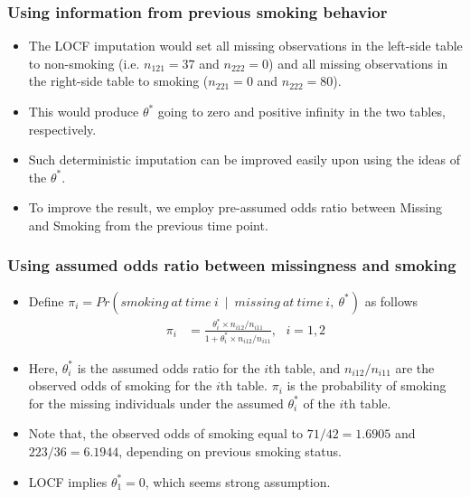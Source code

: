 \documentclass{beamer}
\begin{document}
\begin{frame}
\frametitle{Using information from previous smoking behavior}
\begin{itemize}
\item The LOCF imputation would set all missing observations in the left-side table to non-smoking (i.e. $n_{121} = 37$ and $n_{222} = 0$) and all missing observations in the right-side table to smoking ($n_{221} = 0$ and $n_{222} = 80$).
\vspace{10pt}
\item This would produce $\theta^*$ going to zero and positive infinity in the two tables, respectively.
\vspace{10pt}
\item Such deterministic imputation can be improved easily upon using the ideas of the $\theta^*$.
\vspace{10pt}
\item To improve the result, we employ pre-assumed odds ratio between Missing and Smoking from the previous time point.
\end{itemize}
\end{frame}
\begin{frame}
\frametitle{Using assumed odds ratio between missingness and smoking}
\begin{itemize}
\item Define $\pi_i =  Pr(smoking~at~time~i~\mid~missing~at~time~i,~\theta^*)$ as follows 
\begin{align}
\pi_i &= \frac{\theta_{i}^*\times n_{i12}/n_{i11}}{1 + \theta_{i}^*\times n_{i12}/n_{i11}},~~~i=1,2
\end{align}
\item Here, $\theta_{i}^*$ is the assumed odds ratio for the $i$th table, and $n_{i12}/n_{i11}$ are the observed odds of smoking for the $i$th table. $\pi_i$ is the probability of smoking for the missing individuals under the assumed $\theta_{i}^*$ of the $i$th table.
\vspace{10pt}
\item Note that, the observed odds of smoking equal to $71/42 = 1.6905$ and $223/36 = 6.1944$, depending on previous smoking status.
\vspace{10pt}
\item LOCF implies $\theta_{1}^* = 0$, which seems strong assumption.
\end{itemize}
\end{frame}
\end{document}
